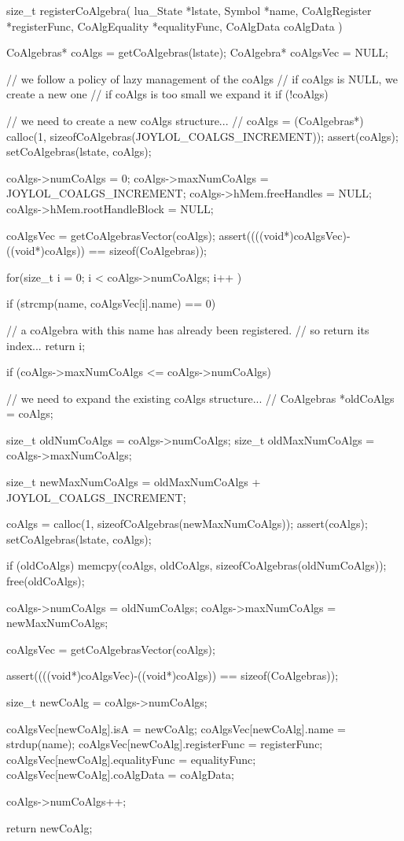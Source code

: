 \startCCode
size_t registerCoAlgebra(
  lua_State     *lstate,
  Symbol        *name,
  CoAlgRegister *registerFunc,
  CoAlgEquality *equalityFunc,
  CoAlgData     coAlgData
) {
  CoAlgebras* coAlgs    = getCoAlgebras(lstate);
  CoAlgebra*  coAlgsVec = NULL;

  // we follow a policy of lazy management of the coAlgs
  // if coAlgs is NULL, we create a new one
  // if coAlgs is too small we expand it
  if (!coAlgs) {
    // we need to create a new coAlgs structure...
    //
    coAlgs = (CoAlgebras*)
      calloc(1, sizeofCoAlgebras(JOYLOL_COALGS_INCREMENT));
    assert(coAlgs);
    setCoAlgebras(lstate, coAlgs);
    
    coAlgs->numCoAlgs            = 0;
    coAlgs->maxNumCoAlgs         = JOYLOL_COALGS_INCREMENT;
    coAlgs->hMem.freeHandles     = NULL;
    coAlgs->hMem.rootHandleBlock = NULL;
  }
  coAlgsVec = getCoAlgebrasVector(coAlgs);
  assert((((void*)coAlgsVec)-((void*)coAlgs)) == sizeof(CoAlgebras));

  for(size_t i = 0; i < coAlgs->numCoAlgs; i++ ) {
    if (strcmp(name, coAlgsVec[i].name) == 0) {
    
      // a coAlgebra with this name has already been registered. 
      // so return its index...
      return i;
    }
  }
  
  if (coAlgs->maxNumCoAlgs <= coAlgs->numCoAlgs) {
    // we need to expand the existing coAlgs structure...
    //  
    CoAlgebras *oldCoAlgs  = coAlgs;
    
    size_t oldNumCoAlgs    = coAlgs->numCoAlgs;
    size_t oldMaxNumCoAlgs = coAlgs->maxNumCoAlgs;
    
    size_t newMaxNumCoAlgs =
      oldMaxNumCoAlgs + JOYLOL_COALGS_INCREMENT;

    coAlgs = calloc(1, sizeofCoAlgebras(newMaxNumCoAlgs));
    assert(coAlgs);
    setCoAlgebras(lstate, coAlgs);
    
    if (oldCoAlgs) {
      memcpy(coAlgs, oldCoAlgs,
        sizeofCoAlgebras(oldNumCoAlgs));
      free(oldCoAlgs);
    }
    
    coAlgs->numCoAlgs    = oldNumCoAlgs;
    coAlgs->maxNumCoAlgs = newMaxNumCoAlgs;

    coAlgsVec = getCoAlgebrasVector(coAlgs);
  }
  assert((((void*)coAlgsVec)-((void*)coAlgs)) == sizeof(CoAlgebras));
  
  size_t newCoAlg = coAlgs->numCoAlgs;
  
  coAlgsVec[newCoAlg].isA           = newCoAlg;
  coAlgsVec[newCoAlg].name          = strdup(name);
  coAlgsVec[newCoAlg].registerFunc  = registerFunc;
  coAlgsVec[newCoAlg].equalityFunc  = equalityFunc;
  coAlgsVec[newCoAlg].coAlgData     = coAlgData;
  
  coAlgs->numCoAlgs++;
  
  return newCoAlg;
}
\stopCCode

